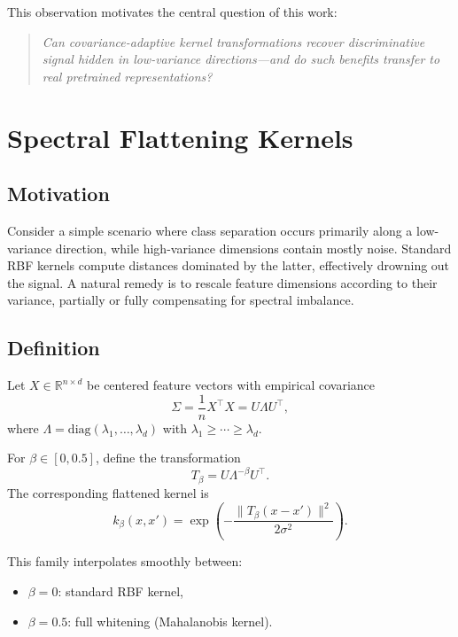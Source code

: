 \documentclass{article}
\begin{document}
This observation motivates the central question of this work:

\begin{quote}
\emph{Can covariance-adaptive kernel transformations recover discriminative signal hidden in low-variance directions—and do such benefits transfer to real pretrained representations?}
\end{quote}

\section{Spectral Flattening Kernels}

\subsection{Motivation}

Consider a simple scenario where class separation occurs primarily along a low-variance direction, while high-variance dimensions contain mostly noise. Standard RBF kernels compute distances dominated by the latter, effectively drowning out the signal. A natural remedy is to rescale feature dimensions according to their variance, partially or fully compensating for spectral imbalance.

\subsection{Definition}

Let $X \in \mathbb{R}^{n \times d}$ be centered feature vectors with empirical covariance
\[
\Sigma = \frac{1}{n} X^\top X = U \Lambda U^\top,
\]
where $\Lambda = \text{diag}(\lambda_1,\dots,\lambda_d)$ with $\lambda_1 \ge \cdots \ge \lambda_d$.

\begin{definition}
For $\beta \in [0,0.5]$, define the transformation
\[
T_\beta = U \Lambda^{-\beta} U^\top.
\]
The corresponding flattened kernel is
\[
k_\beta(x,x') = \exp\left(-\frac{\|T_\beta(x-x')\|^2}{2\sigma^2}\right).
\]
\end{definition}

This family interpolates smoothly between:
\begin{itemize}
    \item $\beta=0$: standard RBF kernel,
    \item $\beta=0.5$: full whitening (Mahalanobis kernel).
\end{itemize}
\end{document}
